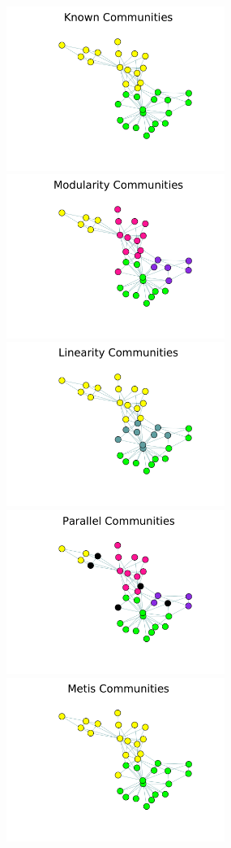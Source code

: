 \documentclass[phd,tocprelim]{cornell}
\begin{document}
\begin{figure}[!h]
\centering
\includegraphics[width=2.8in]{Figures/karate_known}
\includegraphics[width=2.8in]{Figures/karate_module}
\includegraphics[width=2.8in]{Figures/karate_linear}
\includegraphics[width=2.8in]{Figures/karate_parallel}
\includegraphics[width=2.8in]{Figures/karate_metis}

\end{figure}
\end{document}
